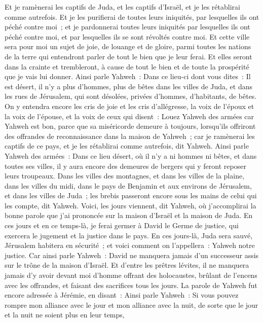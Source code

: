 \begin{multicols}{2}
Et je ramènerai les captifs de Juda, et les captifs d'Israël, et je les rétablirai comme autrefois.
Et je les purifierai de toutes leurs iniquités, par lesquelles ils ont péché contre moi~; et je pardonnerai toutes leurs iniquités par lesquelles ils ont péché contre moi, et par lesquelles ils se sont révoltés contre moi.
Et cette ville sera pour moi un sujet de joie, de louange et de gloire, parmi toutes les nations de la terre qui entendront parler de tout le bien que je leur ferai. Et elles seront dans la crainte et trembleront, à cause de tout le bien et de toute la prospérité que je vais lui donner.
Ainsi parle Yahweh~: Dans ce lieu-ci dont vous dites~: Il est désert, il n'y a plus d'hommes, plus de bêtes dans les villes de Juda, et dans les rues de Jérusalem, qui sont désolées, privées d'hommes, d'habitants, de bêtes.
On y entendra encore les cris de joie et les cris d'allégresse, la voix de l'époux et la voix de l'épouse, et la voix de ceux qui disent~: Louez Yahweh des armées car Yahweh est bon, parce que sa miséricorde demeure à toujours, lorsqu'ils offriront des offrandes de reconnaissance dans la maison de Yahweh~; car je ramènerai les captifs de ce pays, et je les rétablirai comme autrefois, dit Yahweh.
Ainsi parle Yahweh des armées~: Dans ce lieu désert, où il n'y a ni hommes ni bêtes, et dans toutes ses villes, il y aura encore des demeures de bergers qui y feront reposer leurs troupeaux.
Dans les villes des montagnes, et dans les villes de la plaine, dans les villes du midi, dans le pays de Benjamin et aux environs de Jérusalem, et dans les villes de Juda~; les brebis passeront encore sous les mains de celui qui les compte, dit Yahweh.
Voici, les jours viennent, dit Yahweh, où j'accomplirai la bonne parole que j'ai prononcée sur la maison d'Israël et la maison de Juda.
En ces jours et en ce temps-là, je ferai germer à David le Germe de justice, qui exercera le jugement et la justice dans le pays.
En ces jours-là, Juda sera sauvé, Jérusalem habitera en sécurité~; et voici comment on l'appellera~: Yahweh notre justice.
Car ainsi parle Yahweh~: David ne manquera jamais d'un successeur assis sur le trône de la maison d'Israël.
Et d'entre les prêtres lévites, il ne manquera jamais d'y avoir devant moi d'homme offrant des holocaustes, brûlant de l'encens avec les offrandes, et faisant des sacrifices tous les jours.
La parole de Yahweh fut encore adressée à Jérémie, en disant~:
Ainsi parle Yahweh~: Si vous pouvez rompre mon alliance avec le jour et mon alliance avec la nuit, de sorte que le jour et la nuit ne soient plus en leur temps,

\end{multicols}
